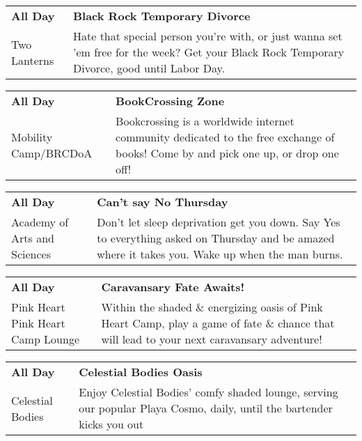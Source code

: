 \begin{tabular}{ p{1in} p{2.2in} }
    \textbf{All Day} & \textbf{Black Rock Temporary Divorce} \\
    Two Lanterns \newline  & Hate that special person you're with, or just wanna set 'em free for the
week? Get your Black Rock Temporary Divorce, good until Labor Day. \\
    \hline 
\end{tabular}
    
\begin{tabular}{ p{1in} p{2.2in} }
    \textbf{All Day} & \textbf{BookCrossing Zone} \\
    Mobility Camp/BRCDoA \newline  & Bookcrossing is a worldwide internet community dedicated to the free exchange of books! Come by and pick one up, or drop one off! \\
    \hline 
\end{tabular}
    
\begin{tabular}{ p{1in} p{2.2in} }
    \textbf{All Day} & \textbf{Can't say No Thursday} \\
    Academy of Arts and Sciences \newline  & Don't let sleep deprivation get you down. Say Yes to everything asked on Thursday and be amazed where it takes you. Wake up when the man burns. \\
    \hline 
\end{tabular}
    
\begin{tabular}{ p{1in} p{2.2in} }
    \textbf{All Day} & \textbf{Caravansary Fate Awaits!} \\
    Pink Heart \newline Pink Heart Camp Lounge & Within the shaded \& energizing oasis of Pink Heart Camp, play a game of fate \& chance that will lead to your next caravansary adventure! \\
    \hline 
\end{tabular}
    
\begin{tabular}{ p{1in} p{2.2in} }
    \textbf{All Day} & \textbf{Celestial Bodies Oasis} \\
    Celestial Bodies \newline  & Enjoy Celestial Bodies' comfy shaded lounge, serving our popular Playa Cosmo, daily, until the bartender kicks you out {\char9786} \\
    \hline 
\end{tabular}
    
